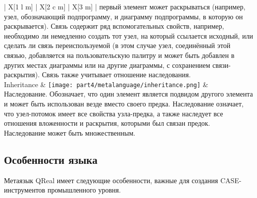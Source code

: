 \begin{center}
\begin{longtabu} {| X[1 l m] | X[2 c m] | X[3 m] |}
		                                                                                                                первый элемент может раскрываться (например, узел, обозначающий подпрограмму, и диаграмму  
		                                                                                                                подпрограммы, в которую он раскрывается). Связь содержит ряд вспомогательных свойств, 
		                                                                                                                например, необходимо ли немедленно создать тот узел, на который ссылается исходный, или 
		                                                                                                                сделать ли связь переиспользуемой (в этом случае узел, соединённый этой связью, 
		                                                                                                                добавляется на пользовательскую палитру и может быть добавлен в других местах 
		                                                                                                                диаграммы или на другие диаграммы, с сохранением связи-раскрытия). Связь также  
		                                                                                                                учитывает отношение наследования. \\
		Inheritance                 & \texttt{[image: part4/metalanguage/inheritance.png]}                 & Наследование. Обозначает, что один элемент является подвидом другого элемента и может 
		                                                                                                                быть использован везде вместо своего предка. Наследование означает, что узел-потомок имеет  
		                                                                                                                все свойства узла-предка, а также наследует все отношения вложенности и раскрытия, 
		                                                                                                                которыми был связан предок. Наследование может быть множественным.
		\label{tab:metalanguage}
	\end{longtabu}

\end{center}

\subsection{Особенности языка}
Метаязык QReal имеет следующие особенности, важные для создания CASE-инструментов 
промышленного уровня.

